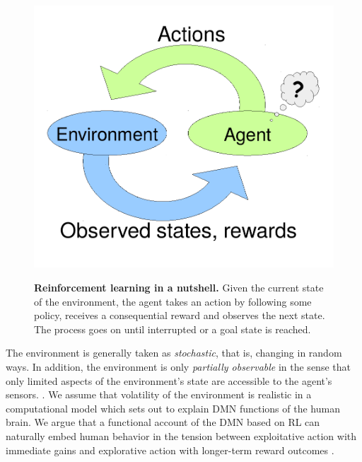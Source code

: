 \documentclass[10pt,letterpaper]{article}
\begin{document}
\begin{figure}
  \caption{\textbf{Reinforcement learning in a nutshell.} Given the current state of the environment,
    the agent takes an action by following some policy, receives a consequential reward and observes the next state. The process goes on until interrupted or a goal state is reached.}
  \centering
  \includegraphics[width=1.\linewidth]{rl.pdf}
  \label{fig:rl}
\end{figure}
The environment is generally taken as \textit{stochastic},
that is, changing in random ways. In addition, the environment is only
\textit{partially observable} in the sense that only limited aspects of the environment's
state are accessible to the agent's sensors.
\citep{starkweather2017dopamine}.
We assume that volatility of the environment
is realistic in a computational model which sets out
to explain DMN functions of the human brain.
We argue that a functional account of the DMN based on RL
can naturally embed human behavior
in the tension between exploitative action with immediate gains and
explorative action with longer-term reward outcomes
\citep{dayan2008decision}.
\end{document}
